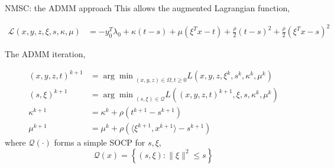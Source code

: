 \begin{frame}{NMSC: the ADMM approach}
  This allows the augmented Lagrangian function,

  \begin{align*}
    \mathscr L\left(x,y,z,\xi,s,\kappa,\mu\right) & = - y_0 ^T\lambda_0 + \kappa(t-s) + \mu(\xi^Tx - t) + \frac{\rho}{2}(t-s)^2 + \frac{\rho}{2}(\xi^Tx - s)^2
  \end{align*}

  The ADMM iteration,

  \begin{align*}
    (x,y,z,t)^{k+1} & = {\arg\min}_{(x,y,z)\in\Omega, t\ge 0} L\left(x,y,z,\xi^k,s^k,\kappa^k,\mu^k\right)       \\
    (s, \xi)^{k+1}  & = {\arg\min}_{(s, \xi)\in\mathscr{Q}} L\left((x,y,z,t)^{k+1},\xi,s, \kappa^k, \mu^k\right) \\
    \kappa^{k+1}    & = \kappa^k + \rho\left(t^{k+1}-s^{k+1}\right)                                              \\
    \mu^{k+1}       & = \mu^k + \rho\left( \langle\xi^{k+1}, x^{k+1}\rangle - s^{k+1}\right)
  \end{align*}
  where \(\mathscr{Q(\cdot)}\) forms a simple SOCP for \(s, \xi\),
  \begin{equation}
    \mathscr{Q}(x) =\left\{(s,\xi): \|\xi\|^2 \le s\right\}
  \end{equation}
\end{frame}
